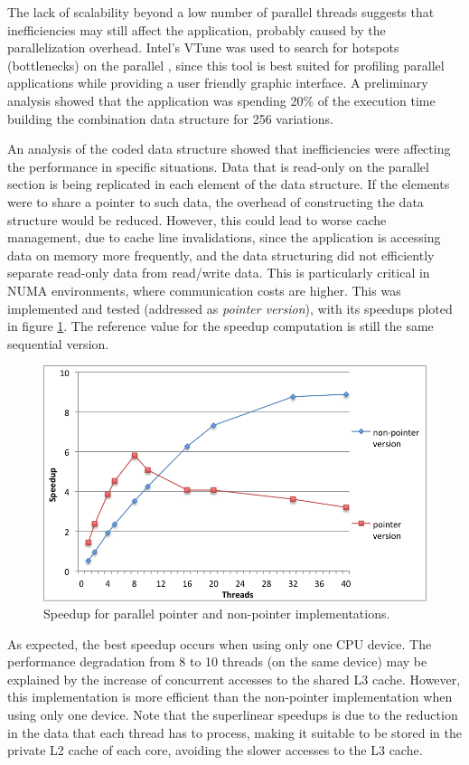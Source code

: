 
The lack of scalability beyond a low number of parallel threads suggests that inefficiencies may still affect the application, probably caused by the parallelization overhead. Intel's VTune was used to search for hotspots (bottlenecks) on the parallel \tth, since this tool is best suited for profiling parallel applications while providing a user friendly graphic interface. A preliminary analysis showed that the application was spending 20\% of the execution time building the combination data structure for 256 variations.

An analysis of the coded data structure showed that inefficiencies were affecting the performance in specific situations. Data that is read-only on the parallel section is being replicated in each element of the data structure. If the elements were to share a pointer to such data, the overhead of constructing the data structure would be reduced. However, this could lead to worse cache management, due to cache line invalidations, since the application is accessing data on memory more frequently, and the data structuring did not efficiently separate read-only data from read/write data. This is particularly critical in NUMA environments, where communication costs are higher. This was implemented and tested (addressed as \textit{pointer version}), with its speedups ploted in figure \ref{fig:pointer_speedup}. The reference value for the speedup computation is still the same sequential version.

\begin{figure}[!htp]
	\begin{center}
		\includegraphics[scale=0.55]{charts/speedup_pointer_omp.png}
		\caption{Speedup for \tth parallel pointer and non-pointer implementations.}
		\label{fig:pointer_speedup}
	\end{center}
\end{figure}

As expected, the best speedup occurs when using only one CPU device. The performance degradation from 8 to 10 threads (on the same device) may be explained by the increase of concurrent accesses to the shared L3 cache. However, this implementation is more efficient than the non-pointer implementation when using only one device. Note that the superlinear speedups is due to the reduction in the data that each thread has to process, making it suitable to be stored in the private L2 cache of each core, avoiding the slower accesses to the L3 cache.
